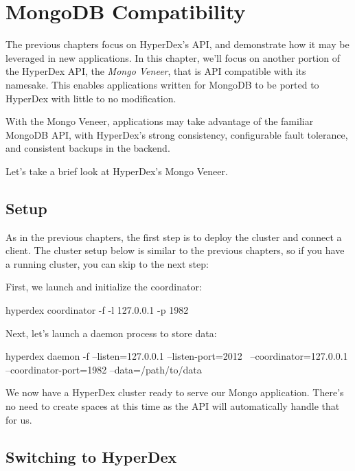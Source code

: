 \chapter{MongoDB Compatibility}
\label{chap:mongodb}

The previous chapters focus on HyperDex's API, and demonstrate how it may be
leveraged in new applications.  In this chapter, we'll focus on another portion
of the HyperDex API, the {\em Mongo Veneer}, that is API compatible with its
namesake.  This enables applications written for MongoDB to be ported to
HyperDex with little to no modification.

With the Mongo Veneer, applications may take advantage of the familiar MongoDB
API, with HyperDex's strong consistency, configurable fault tolerance, and
consistent backups in the backend.

Let's take a brief look at HyperDex's Mongo Veneer.

\section{Setup}
\label{sec:mongodb:setup}

As in the previous chapters, the first step is to deploy the cluster and connect
a client.  The cluster setup below is similar to the previous chapters, so if
you have a running cluster, you can skip to the next step:

First, we launch and initialize the coordinator:

\begin{consolecode}
hyperdex coordinator -f -l 127.0.0.1 -p 1982
\end{consolecode}

Next, let's launch a daemon process to store data:

\begin{consolecode}
hyperdex daemon -f --listen=127.0.0.1 --listen-port=2012 \
                   --coordinator=127.0.0.1 --coordinator-port=1982 --data=/path/to/data
\end{consolecode}

We now have a HyperDex cluster ready to serve our Mongo application.  There's no
need to create spaces at this time as the API will automatically handle that for
us.

\section{Switching to HyperDex}

